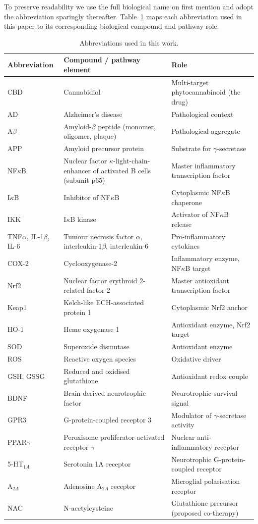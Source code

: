 \documentclass[10pt,letterpaper]{article}
\begin{document}
To preserve readability we use the full biological name on first mention and adopt the abbreviation sparingly thereafter. Table~\ref{tab:nomenclature} maps each abbreviation used in this paper to its corresponding biological compound and pathway role.

\begin{table}[htbp]
\centering
\footnotesize
\setlength{\tabcolsep}{4pt}
\caption{Abbreviations used in this work.}
\label{tab:nomenclature}
\begin{tabular}{@{}l p{} p{}@{}}
\toprule
Abbreviation & Compound / pathway element & Role \\
\midrule
CBD & Cannabidiol & Multi-target phytocannabinoid (the drug) \\
AD  & Alzheimer's disease & Pathological context \\
A$\beta$ & Amyloid-$\beta$ peptide (monomer, oligomer, plaque) & Pathological aggregate \\
APP & Amyloid precursor protein & Substrate for $\gamma$-secretase \\
NF$\kappa$B & Nuclear factor $\kappa$-light-chain-enhancer of activated B cells (subunit p65) & Master inflammatory transcription factor \\
I$\kappa$B  & Inhibitor of NF$\kappa$B & Cytoplasmic NF$\kappa$B chaperone \\
IKK         & I$\kappa$B kinase & Activator of NF$\kappa$B release \\
TNF$\alpha$, IL-1$\beta$, IL-6 & Tumour necrosis factor $\alpha$, interleukin-1$\beta$, interleukin-6 & Pro-inflammatory cytokines \\
COX-2 & Cyclooxygenase-2 & Inflammatory enzyme, NF$\kappa$B target \\
Nrf2 & Nuclear factor erythroid 2-related factor 2 & Master antioxidant transcription factor \\
Keap1 & Kelch-like ECH-associated protein 1 & Cytoplasmic Nrf2 anchor \\
HO-1  & Heme oxygenase 1 & Antioxidant enzyme, Nrf2 target \\
SOD   & Superoxide dismutase & Antioxidant enzyme \\
ROS   & Reactive oxygen species & Oxidative driver \\
GSH, GSSG & Reduced and oxidised glutathione & Antioxidant redox couple \\
BDNF  & Brain-derived neurotrophic factor & Neurotrophic survival signal \\
GPR3  & G-protein-coupled receptor 3 & Modulator of $\gamma$-secretase activity \\
PPAR$\gamma$ & Peroxisome proliferator-activated receptor $\gamma$ & Nuclear anti-inflammatory receptor \\
5-HT$_{1A}$  & Serotonin 1A receptor & Neurotrophic G-protein-coupled receptor \\
A$_{2A}$    & Adenosine A$_{2A}$ receptor & Microglial polarisation receptor \\
NAC & N-acetylcysteine & Glutathione precursor (proposed co-therapy) \\
\bottomrule
\end{tabular}
\end{table}
\end{document}
